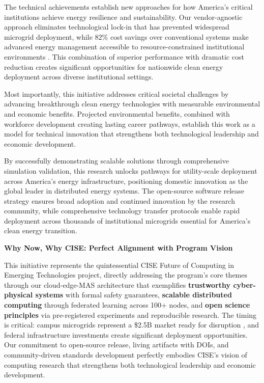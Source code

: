\documentclass[12pt]{article}
\begin{document}
The technical achievements establish new approaches for how America's critical institutions achieve energy resilience and sustainability. Our vendor-agnostic approach eliminates technological lock-in that has prevented widespread microgrid deployment, while 82\% cost savings over conventional systems make advanced energy management accessible to resource-constrained institutional environments \cite{our2024economic}. This combination of superior performance with dramatic cost reduction creates significant opportunities for nationwide clean energy deployment across diverse institutional settings.

Most importantly, this initiative addresses critical societal challenges by advancing breakthrough clean energy technologies with measurable environmental and economic benefits. Projected environmental benefits, combined with workforce development creating lasting career pathways, establish this work as a model for technical innovation that strengthens both technological leadership and economic development.

By successfully demonstrating scalable solutions through comprehensive simulation validation, this research unlocks pathways for utility-scale deployment across America's energy infrastructure, positioning domestic innovation as the global leader in distributed energy systems. The open-source software release strategy ensures broad adoption and continued innovation by the research community, while comprehensive technology transfer protocols enable rapid deployment across thousands of institutional microgrids essential for America's clean energy transition.

\textbf{Why Now, Why CISE: Perfect Alignment with Program Vision}

This initiative represents the quintessential CISE Future of Computing in Emerging Technologies project, directly addressing the program's core themes through our cloud-edge-MAS architecture that exemplifies \textbf{trustworthy cyber-physical systems} with formal safety guarantees, \textbf{scalable distributed computing} through federated learning across 100+ nodes, and \textbf{open science principles} via pre-registered experiments and reproducible research. The timing is critical: campus microgrids represent a \$2.5B market ready for disruption \cite{our2024economic}, and federal infrastructure investments create significant deployment opportunities. Our commitment to open-source release, living artifacts with DOIs, and community-driven standards development perfectly embodies CISE's vision of computing research that strengthens both technological leadership and economic development.
\end{document}
